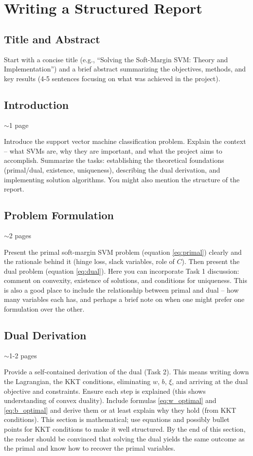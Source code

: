 \section{Writing a Structured Report}

\subsection*{Title and Abstract}
Start with a concise title (e.g., ``Solving the Soft-Margin SVM: Theory and Implementation'') and a brief abstract summarizing the objectives, methods, and key results (4-5 sentences focusing on what was achieved in the project).

\subsection{Introduction} 
$\sim$1 page

Introduce the support vector machine classification problem. Explain the context -- what SVMs are, why they are important, and what the project aims to accomplish. Summarize the tasks: establishing the theoretical foundations (primal/dual, existence, uniqueness), describing the dual derivation, and implementing solution algorithms. You might also mention the structure of the report.

\subsection{Problem Formulation}
$\sim$2 pages

Present the primal soft-margin SVM problem (equation \eqref{eq:primal}) clearly and the rationale behind it (hinge loss, slack variables, role of $C$). Then present the dual problem (equation \eqref{eq:dual}). Here you can incorporate Task 1 discussion: comment on convexity, existence of solutions, and conditions for uniqueness. This is also a good place to include the relationship between primal and dual -- how many variables each has, and perhaps a brief note on when one might prefer one formulation over the other.

\subsection{Dual Derivation}
$\sim$1-2 pages

Provide a self-contained derivation of the dual (Task 2). This means writing down the Lagrangian, the KKT conditions, eliminating $w$, $b$, $\xi$, and arriving at the dual objective and constraints. Ensure each step is explained (this shows understanding of convex duality). Include formulas \eqref{eq:w_optimal} and \eqref{eq:b_optimal} and derive them or at least explain why they hold (from KKT conditions). This section is mathematical; use equations and possibly bullet points for KKT conditions to make it well structured. By the end of this section, the reader should be convinced that solving the dual yields the same outcome as the primal and know how to recover the primal variables.

